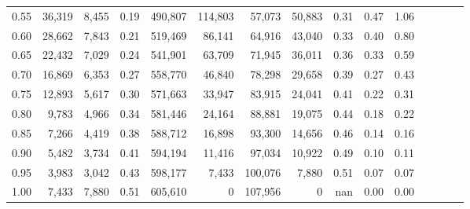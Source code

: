 \begin{tabular}{rrrcrrrrrrrrrrr}
0.55 &  36,319 &  8,455 &                                       0.19 &  490,807 &  114,803 &   57,073 &   50,883 &  0.31 &  0.47 &                         1.06 \\
0.60 &  28,662 &  7,843 &                                       0.21 &  519,469 &   86,141 &   64,916 &   43,040 &  0.33 &  0.40 &                         0.80 \\
0.65 &  22,432 &  7,029 &                                       0.24 &  541,901 &   63,709 &   71,945 &   36,011 &  0.36 &  0.33 &                         0.59 \\
0.70 &  16,869 &  6,353 &                                       0.27 &  558,770 &   46,840 &   78,298 &   29,658 &  0.39 &  0.27 &                         0.43 \\
0.75 &  12,893 &  5,617 &                                       0.30 &  571,663 &   33,947 &   83,915 &   24,041 &  0.41 &  0.22 &                         0.31 \\
0.80 &   9,783 &  4,966 &                                       0.34 &  581,446 &   24,164 &   88,881 &   19,075 &  0.44 &  0.18 &                         0.22 \\
0.85 &   7,266 &  4,419 &                                       0.38 &  588,712 &   16,898 &   93,300 &   14,656 &  0.46 &  0.14 &                         0.16 \\
0.90 &   5,482 &  3,734 &                                       0.41 &  594,194 &   11,416 &   97,034 &   10,922 &  0.49 &  0.10 &                         0.11 \\
0.95 &   3,983 &  3,042 &                                       0.43 &  598,177 &    7,433 &  100,076 &    7,880 &  0.51 &  0.07 &                         0.07 \\
1.00 &   7,433 &  7,880 &                                       0.51 &  605,610 &        0 &  107,956 &        0 &   nan &  0.00 &                         0.00 \\
\bottomrule
\end{tabular}

